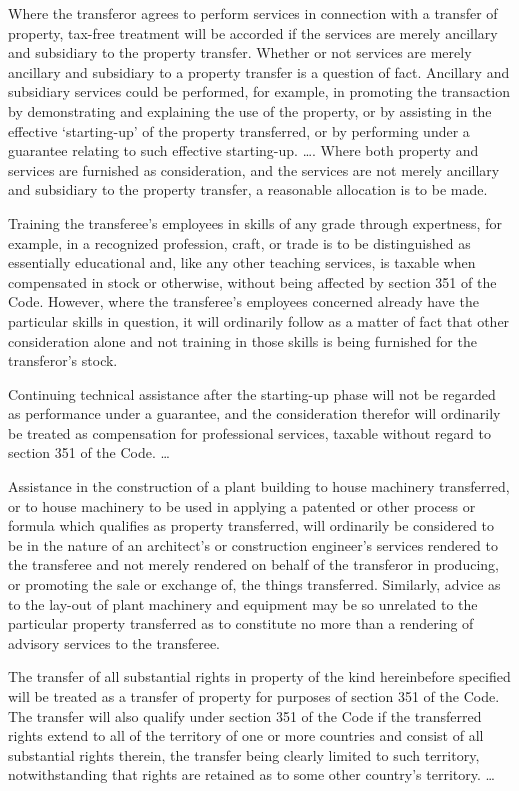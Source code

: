 \begin{select}
Where the transferor agrees to perform services in connection with a transfer of property, tax-free treatment will be accorded if the services are merely ancillary and subsidiary to the property transfer. Whether or not services are merely ancillary and subsidiary to a property transfer is a question of fact. Ancillary and subsidiary services could be performed, for example, in promoting the transaction by demonstrating and explaining the use of the property, or by assisting in the effective `starting-up' of the property transferred, or by performing under a guarantee relating to such effective starting-up. \ldots. Where both property and services are furnished as consideration, and the services are not merely ancillary and subsidiary to the property transfer, a reasonable allocation is to be made.

Training the transferee's employees in skills of any grade through expertness, for example, in a recognized profession, craft, or trade is to be distinguished as essentially educational and, like any other teaching services, is taxable when compensated in stock or otherwise, without being affected by section 351 of the Code. However, where the transferee's employees concerned already have the particular skills in question, it will ordinarily follow as a matter of fact that other consideration alone and not training in those skills is being furnished for the transferor's stock.

Continuing technical assistance after the starting-up phase will not be regarded as performance under a guarantee, and the consideration therefor will ordinarily be treated as compensation for professional services, taxable without regard to section 351 of the Code. \ldots

Assistance in the construction of a plant building to house machinery transferred, or to house machinery to be used in applying a patented or other process or formula which qualifies as property transferred, will ordinarily be considered to be in the nature of an architect's or construction engineer's services rendered to the transferee and not merely rendered on behalf of the transferor in producing, or promoting the sale or exchange of, the things transferred. Similarly, advice as to the lay-out of plant machinery and equipment may be so unrelated to the particular property transferred as to constitute no more than a rendering of advisory services to the transferee.

The transfer of all substantial rights in property of the kind hereinbefore specified will be treated as a transfer of property for purposes of section 351 of the Code. The transfer will also qualify under section 351 of the Code if the transferred rights extend to all of the territory of one or more countries and consist of all substantial rights therein, the transfer being clearly limited to such territory, notwithstanding that rights are retained as to some other country's territory. \ldots


\end{select}
